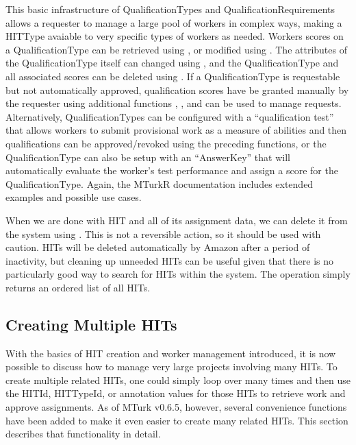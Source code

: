 This basic infrastructure of QualificationTypes and QualificationRequirements allows a requester to manage a large pool of workers in complex ways, making a HITType avaiable to very specific types of workers as needed. Workers scores on a QualificationType can be retrieved using , or modified using . The attributes of the QualificationType itself can changed using , and the QualificationType and all associated scores can be deleted using . If a QualificationType is requestable but not automatically approved, qualification scores have be granted manually by the requester using additional functions , , and  can be used to manage requests. Alternatively, QualificationTypes can be configured with a ``qualification test'' that allows workers to submit provisional work as a measure of abilities and then qualifications can be approved/revoked using the preceding functions, or the QualificationType can also be setup with an ``AnswerKey'' that will automatically evaluate the worker's test performance and assign a score for the QualificationType. Again, the MTurkR documentation includes extended examples and possible use cases.

When we are done with HIT and all of its assignment data, we can delete it from the system using . This is not a reversible action, so it should be used with caution. HITs will be deleted automatically by Amazon after a period of inactivity, but cleaning up unneeded HITs can be useful given that there is no particularly good way to search for HITs within the system. The  operation simply returns an ordered list of all HITs.


\subsection{Creating Multiple HITs}

With the basics of HIT creation and worker management introduced, it is now possible to discuss how to manage very large projects involving many HITs. To create multiple related HITs, one could simply loop over  many times and then use the HITId, HITTypeId, or annotation values for those HITs to retrieve work and approve assignments. As of MTurk v0.6.5, however, several convenience functions have been added to make it even easier to create many related HITs. This section describes that functionality in detail.

